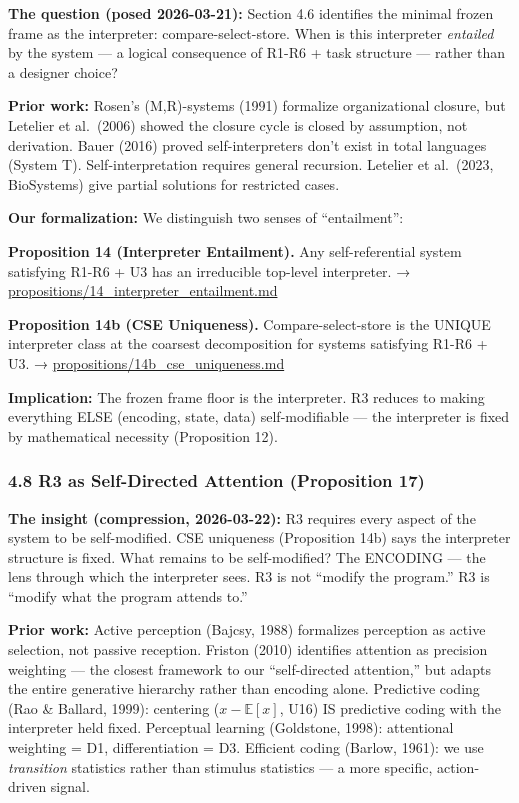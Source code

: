 \documentclass[
  11pt,
]{article}
\begin{document}
\textbf{The question (posed 2026-03-21):} Section 4.6 identifies the
minimal frozen frame as the interpreter: compare-select-store. When is
this interpreter \emph{entailed} by the system --- a logical consequence
of R1-R6 + task structure --- rather than a designer choice?

\textbf{Prior work:} Rosen's (M,R)-systems (1991) formalize
organizational closure, but Letelier et al.~(2006) showed the closure
cycle is closed by assumption, not derivation. Bauer (2016) proved
self-interpreters don't exist in total languages (System T).
Self-interpretation requires general recursion. Letelier et al.~(2023,
BioSystems) give partial solutions for restricted cases.

\textbf{Our formalization:} We distinguish two senses of ``entailment'':

\textbf{Proposition 14 (Interpreter Entailment).} Any self-referential
system satisfying R1-R6 + U3 has an irreducible top-level interpreter. →
\url{propositions/14_interpreter_entailment.md}

\textbf{Proposition 14b (CSE Uniqueness).} Compare-select-store is the
UNIQUE interpreter class at the coarsest decomposition for systems
satisfying R1-R6 + U3. → \url{propositions/14b_cse_uniqueness.md}

\textbf{Implication:} The frozen frame floor is the interpreter. R3
reduces to making everything ELSE (encoding, state, data)
self-modifiable --- the interpreter is fixed by mathematical necessity
(Proposition 12).

\subsubsection{4.8 R3 as Self-Directed Attention (Proposition
17)}\label{r3-as-self-directed-attention-proposition-17}

\textbf{The insight (compression, 2026-03-22):} R3 requires every aspect
of the system to be self-modified. CSE uniqueness (Proposition 14b) says
the interpreter structure is fixed. What remains to be self-modified?
The ENCODING --- the lens through which the interpreter sees. R3 is not
``modify the program.'' R3 is ``modify what the program attends to.''

\textbf{Prior work:} Active perception (Bajcsy, 1988) formalizes
perception as active selection, not passive reception. Friston (2010)
identifies attention as precision weighting --- the closest framework to
our ``self-directed attention,'' but adapts the entire generative
hierarchy rather than encoding alone. Predictive coding (Rao \& Ballard,
1999): centering (\(x - \mathbb{E}[x]\), U16) IS predictive coding with
the interpreter held fixed. Perceptual learning (Goldstone, 1998):
attentional weighting = D1, differentiation = D3. Efficient coding
(Barlow, 1961): we use \emph{transition} statistics rather than stimulus
statistics --- a more specific, action-driven signal.
\end{document}
